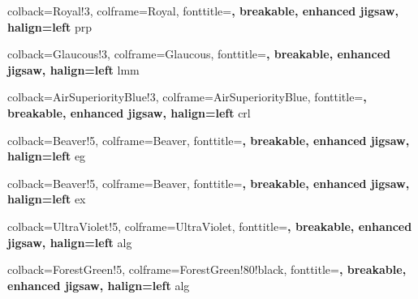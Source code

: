 %
{	colback=Royal!3, 
	colframe=Royal, 
	fonttitle=\bfseries, 
	breakable, 
	enhanced jigsaw, 
	halign=left
}{prp}

%
{	colback=Glaucous!3, 
	colframe=Glaucous, 
	fonttitle=\bfseries, 
	breakable, 
	enhanced jigsaw, 
	halign=left
}{lmm}

%
{	colback=AirSuperiorityBlue!3, 
	colframe=AirSuperiorityBlue, 
	fonttitle=\bfseries, 
	breakable, 
	enhanced jigsaw, 
	halign=left
}{crl}

%
{	colback=Beaver!5, 
	colframe=Beaver, 
	fonttitle=\bfseries, 
	breakable, 
	enhanced jigsaw, 
	halign=left
}{eg}

%
{	colback=Beaver!5, 
	colframe=Beaver, 
	fonttitle=\bfseries, 
	breakable, 
	enhanced jigsaw, 
	halign=left
}{ex}

%
{	colback=UltraViolet!5, 
	colframe=UltraViolet, 
	fonttitle=\bfseries, 
	breakable, 
	enhanced jigsaw, 
	halign=left
}{alg}

%
{	colback=ForestGreen!5, 
	colframe=ForestGreen!80!black, 
	fonttitle=\bfseries, 
	breakable, 
	enhanced jigsaw, 
	halign=left
}{alg}


\hypersetup{
    colorlinks=true, %
    linktoc=all,     %
    linkcolor=DarkBlue,  %
}

